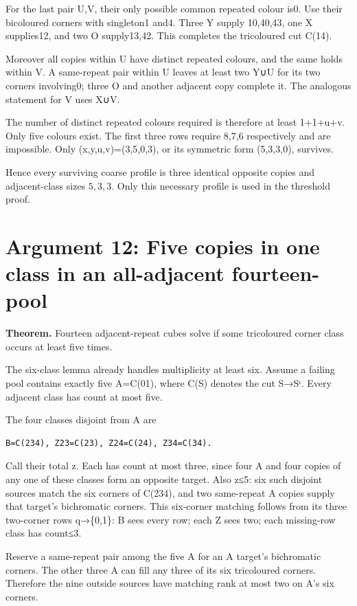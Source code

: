 \documentclass[
  10pt,
]{article}
\begin{document}
For the last pair U,V, their only possible common repeated colour is0.
Use their bicoloured corners with singleton1 and4. Three Y supply
10,40,43, one X supplies12, and two O supply13,42. This completes the
tricoloured cut C(14).

Moreover all copies within U have distinct repeated colours, and the
same holds within V. A same-repeat pair within U leaves at least two Y∪U
for its two corners involving0; three O and another adjacent copy
complete it. The analogous statement for V uses X∪V.

The number of distinct repeated colours required is therefore at least
1+1+u+v. Only five colours exist. The first three rows require 8,7,6
respectively and are impossible. Only (x,y,u,v)=(3,5,0,3), or its
symmetric form (5,3,3,0), survives.

Hence every surviving coarse profile is three identical opposite copies
and adjacent-class sizes \(5,3,3\). Only this necessary profile is used
in the threshold proof.

\hypertarget{arg-12}{%
\section{Argument 12: Five copies in one class in an all-adjacent
fourteen-pool}\label{arg-12}}

\textbf{Theorem.} Fourteen adjacent-repeat cubes solve if some
tricoloured corner class occurs at least five times.

The six-class lemma already handles multiplicity at least six. Assume a
failing pool contains exactly five A=C(01), where C(S) denotes the cut
S→Sᶜ. Every adjacent class has count at most five.

The four classes disjoint from A are

\begin{verbatim}
B=C(234), Z23=C(23), Z24=C(24), Z34=C(34).
\end{verbatim}

Call their total z. Each has count at most three, since four A and four
copies of any one of these classes form an opposite target. Also z≤5:
six such disjoint sources match the six corners of C(234), and two
same-repeat A copies supply that target's bichromatic corners. This
six-corner matching follows from its three two-corner rows q→\{0,1\}: B
sees every row; each Z sees two; each missing-row class has count≤3.

Reserve a same-repeat pair among the five A for an A target's
bichromatic corners. The other three A can fill any three of its six
tricoloured corners. Therefore the nine outside sources have matching
rank at most two on A's six corners.
\end{document}
